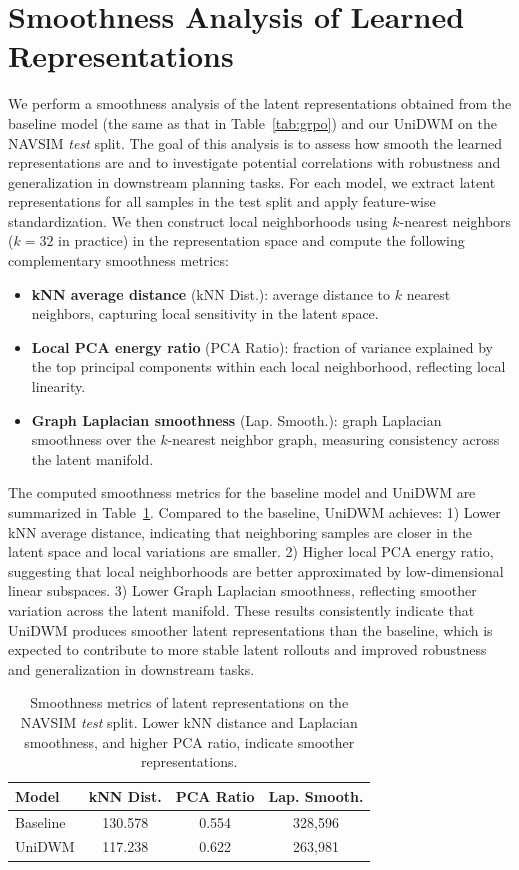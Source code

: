 \documentclass{article}
\theoremstyle{plain}
\theoremstyle{definition}
\theoremstyle{remark}
\begin{document}
\section{Smoothness Analysis of Learned Representations}
\label{sec:appendix_smoothness}

We perform a smoothness analysis of the latent representations obtained from the baseline model (the same as that in Table~\ref{tab:grpo}) and our UniDWM on the NAVSIM \textit{test} split. The goal of this analysis is to assess how smooth the learned representations are and to investigate potential correlations with robustness and generalization in downstream planning tasks. For each model, we extract latent representations for all samples in the test split and apply feature-wise standardization. We then construct local neighborhoods using $k$-nearest neighbors ($k=32$ in practice) in the representation space and compute the following complementary smoothness metrics:

\begin{itemize}
    \item \textbf{kNN average distance} (kNN Dist.): average distance to $k$ nearest neighbors, capturing local sensitivity in the latent space.
    \item \textbf{Local PCA energy ratio} (PCA Ratio): fraction of variance explained by the top principal components within each local neighborhood, reflecting local linearity.
    \item \textbf{Graph Laplacian smoothness} (Lap. Smooth.): graph Laplacian smoothness over the $k$-nearest neighbor graph, measuring consistency across the latent manifold.
\end{itemize}

The computed smoothness metrics for the baseline model and UniDWM are summarized in Table~\ref{tab:smoothness_results}. Compared to the baseline, UniDWM achieves: 1) Lower kNN average distance, indicating that neighboring samples are closer in the latent space and local variations are smaller. 2) Higher local PCA energy ratio, suggesting that local neighborhoods are better approximated by low-dimensional linear subspaces. 3) Lower Graph Laplacian smoothness, reflecting smoother variation across the latent manifold. These results consistently indicate that UniDWM produces smoother latent representations than the baseline, which is expected to contribute to more stable latent rollouts and improved robustness and generalization in downstream tasks.

\begin{table}[h!]
\centering
\caption{Smoothness metrics of latent representations on the NAVSIM \textit{test} split. Lower kNN distance and Laplacian smoothness, and higher PCA ratio, indicate smoother representations.}
\label{tab:smoothness_results}
\begin{tabular}{lccc}
\toprule
Model & kNN Dist. & PCA Ratio & Lap. Smooth. \\
\midrule
Baseline & 130.578 & 0.554 & 328,596 \\
UniDWM   & 117.238 & 0.622 & 263,981 \\
\bottomrule
\end{tabular}
\end{table}
\end{document}
